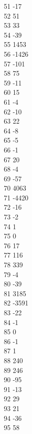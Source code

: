 { 51	-17 \\
 52	51 \\
 53	33 \\
 54	-39 \\
 55	1453 \\
 56	-1426 \\
 57	-101 \\
 58	75 \\
 59	-11 \\
 60	15 \\
 61	-4 \\
 62	-10 \\
 63	22 \\
 64	-8 \\
 65	-5 \\
 66	-1 \\
 67	20 \\
 68	-4 \\
 69	-57 \\
 70	4063 \\
 71	-4420 \\
 72	-16 \\
 73	-2 \\
 74	1 \\
 75	0 \\
 76	17 \\
 77	116 \\
 78	339 \\
 79	-4 \\
 80	-39 \\
 81	3185 \\
 82	-3591 \\
 83	-22 \\
 84	-1 \\
 85	0 \\
 86	-1 \\
 87	1 \\
 88	240 \\
 89	246 \\
 90	-95 \\
 91	-13 \\
 92	29 \\
 93	21 \\
 94	-36 \\
 95	58 \\
}
